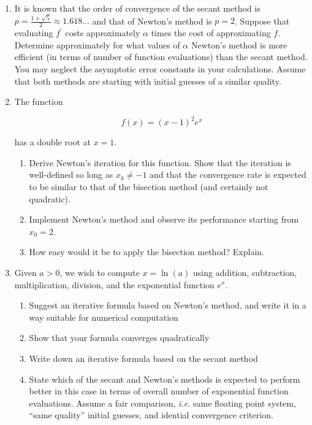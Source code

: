 \documentclass[12pt]{article}
\begin{document}
\begin{enumerate}
\item It is known that the order of convergence of the secant method is $p = \frac{1 + \sqrt{5}}{2} \approx 1.618\ldots$
and that of Newton's method is $p = 2$. Suppose that evaluating $f^{\prime}$ costs approximately
$\alpha$ times the cost of approximating $f$. Determine approximately for what values of $\alpha$
Newton's method is more efficient (in terms of number of function evaluations) than the secant method.
You may neglect the asymptotic error constants in your calculations. Assume that both methods
are starting with initial guesses of a similar quality.

\item The function

\[
f(x) = (x-1)^{2}e^{x}
\]

has a double root at $x = 1$.

\begin{enumerate}
\item Derive Newton's iteration for this function. Show that the iteration is well-defined
so long as $x_{k} \neq -1$ and that the convergence rate is expected to be similar to that
of the bisection method (and certainly not quadratic).
\item Implement Newton's method and observe its performance starting from $x_{0} = 2$.
\item How easy would it be to apply the bisection method? Explain.
\end{enumerate}

\item Given $a > 0$, we wish to compute $x = \ln (a)$ using addition, subtraction, multiplication,
division, and the exponential function $e^{x}$.
\begin{enumerate}
\item Suggest an iterative formula based on Newton's method, and write it in a way suitable
for numerical computation
\item Show that your formula converges quadratically
\item Write down an iterative formula based on the secant method
\item State which of the secant and Newton's methods is expected to perform better in
this case in terms of overall number of exponential function evaluations. Assume a fair
comparison, {\em i.e.} same floating point system, ``same quality'' initial guesses, and idential
convergence criterion.
\end{enumerate}


\end{enumerate}
\end{document}
